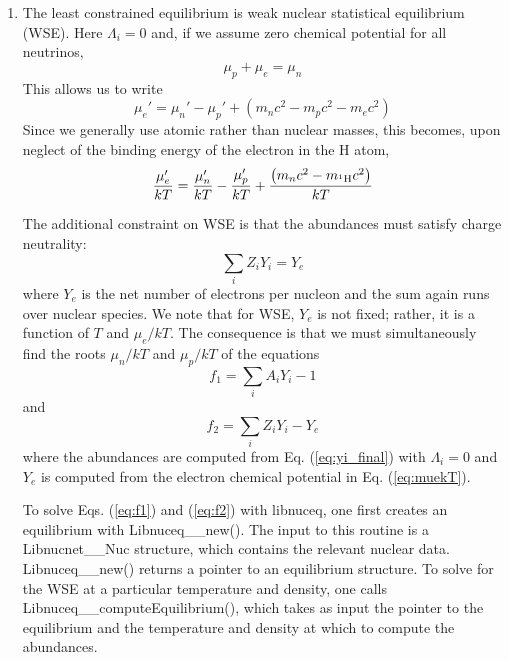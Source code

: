 \documentclass{article}    %
\begin{document}
\begin{enumerate}

\item \label{sec:wse}
The least constrained equilibrium is weak nuclear statistical equilibrium (WSE).
Here $\Lambda_i = 0$ and, if we assume zero chemical potential for all
neutrinos,
\begin{equation}
\mu_p + \mu_e = \mu_n
\label{eq:weak}
\end{equation}
This allows us to write
\begin{equation}
\mu_e' = \mu_n' - \mu_p' + \left( m_nc^2 - m_pc^2 - m_ec^2 \right)
\label{eq:mue'}
\end{equation}
Since we generally use atomic rather than nuclear masses, this becomes,
upon neglect of the binding energy of the electron in the H atom,
\begin{equation}
\frac{\mu_e'}{kT} =
\frac{\mu_n'}{kT} - \frac{\mu_p'}{kT} +
\frac{\left( m_nc^2 - m_{^1{\rm H}}c^2\right)}{kT}
\label{eq:muekT}
\end{equation}

The additional constraint on WSE is that the abundances must satisfy
charge neutrality:
\begin{equation}
\sum_i Z_i Y_i = Y_e
\label{eq:ye}
\end{equation}
where $Y_e$ is the net number of electrons per nucleon and the sum again
runs over nuclear species.  We note that for WSE,
$Y_e$ is not fixed; rather, it is a function of $T$ and $\mu_e / kT$.
The consequence is that we must simultaneously find the roots $\mu_n/kT$ and
$\mu_p/kT$ of the equations
\begin{equation}
f_1 = \sum_i A_i Y_i - 1
\label{eq:f1}
\end{equation}
and
\begin{equation}
f_2 = \sum_i Z_i Y_i - Y_e
\label{eq:f2}
\end{equation}
where the abundances are computed from Eq. (\ref{eq:yi_final}) with
$\Lambda_i = 0$ and $Y_e$ is computed from the electron chemical potential
in Eq. (\ref{eq:muekT}).

To solve Eqs. (\ref{eq:f1}) and (\ref{eq:f2}) with libnuceq, one first
creates an equilibrium with Libnuceq\_\_new().  The input to this routine
is a Libnucnet\_\_Nuc structure, which contains the relevant nuclear data.
Libnuceq\_\_new() returns a pointer to an equilibrium structure.
To solve for the WSE at a particular temperature and density, one calls
Libnuceq\_\_computeEquilibrium(), which takes as input the pointer to
the equilibrium and the temperature and density at which to compute the
abundances.


\end{enumerate}
\end{document}

